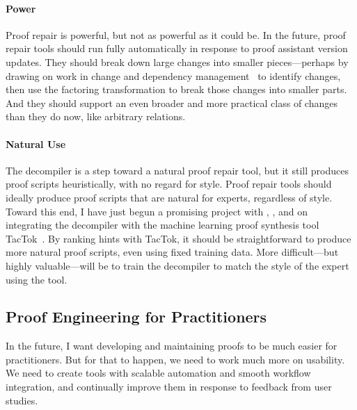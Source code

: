 
\paragraph{Power}
Proof repair is powerful, but not as powerful as it could be.
In the future, proof repair tools should run fully automatically in response to proof assistant version updates.
They should break down large changes into smaller pieces---perhaps by drawing on work in change and 
dependency management~\cite{873647, Autexier:2010:CMH:1986659.1986663, Celik:2017:IRP:3155562.3155588} to identify changes, then use the factoring transformation
to break those changes into smaller parts.
And they should support an even broader and more practical class of changes than they do now, like arbitrary relations.

\paragraph{Natural Use}
The decompiler is a step toward a natural proof repair tool, but it still produces proof scripts heuristically,
with no regard for style.
Proof repair tools should ideally produce proof scripts that are natural for experts, regardless of style.
Toward this end, I have just begun a promising project with , , and 
on integrating the decompiler with the machine learning proof synthesis tool TacTok~\cite{10.1145/3428299}.
By ranking hints with TacTok, it should be straightforward to produce more natural proof scripts, even using fixed training data.
More difficult---but highly valuable---will be to train the decompiler to match the style of the expert using the tool.

\subsection*{Proof Engineering for Practitioners}

In the future, I want developing and maintaining proofs to be much easier for practitioners.
But for that to happen, we need to work much more on usability.
We need to create tools with scalable automation and smooth workflow integration,
and continually improve them in response to feedback from user studies.

